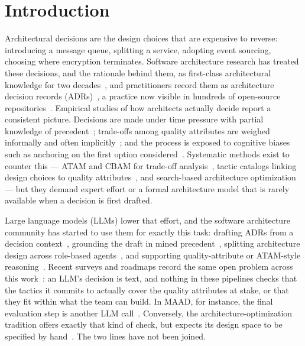 \documentclass[preprint,12pt,authoryear]{elsarticle}
\renewcommand{\_}{\textunderscore\allowbreak{}}
\begin{document}
\linenumbers

\section{Introduction}

Architectural decisions are the design choices that are expensive to reverse: introducing a message queue, splitting a service, adopting event sourcing, choosing where encryption terminates. Software architecture research has treated these decisions, and the rationale behind them, as first-class architectural knowledge for two decades~\citep{jansen2005,kruchten2004,tang2006}, and practitioners record them as architecture decision records (ADRs)~\citep{tyree2005}, a practice now visible in hundreds of open-source repositories~\citep{buchgeher2023adr}. Empirical studies of how architects actually decide report a consistent picture. Decisions are made under time pressure with partial knowledge of precedent~\citep{vanvliet2016,weinreich2015}; trade-offs among quality attributes are weighed informally and often implicitly~\citep{zalewski2017,falessi2011}; and the process is exposed to cognitive biases such as anchoring on the first option considered~\citep{borowa2021,razavian2016}. Systematic methods exist to counter this --- ATAM and CBAM for trade-off analysis~\citep{kazman1998atam,kazman2001cbam}, tactic catalogs linking design choices to quality attributes~\citep{bachmann2003,bass2021saip}, and search-based architecture optimization~\citep{aleti2013,koziolek2011peropteryx} --- but they demand expert effort or a formal architecture model that is rarely available when a decision is first drafted.

Large language models (LLMs) lower that effort, and the software architecture community has started to use them for exactly this task: drafting ADRs from a decision context~\citep{dhar2024llm}, grounding the draft in mined precedent~\citep{contextmatters2026}, splitting architecture design across role-based agents~\citep{zhang2025maad}, and supporting quality-attribute or ATAM-style reasoning~\citep{diazpace2025,capilla2025atam}. Recent surveys and roadmaps record the same open problem across this work~\citep{hou2024,esposito2026,schmid2025}: an LLM's decision is text, and nothing in these pipelines checks that the tactics it commits to actually cover the quality attributes at stake, or that they fit within what the team can build. In MAAD, for instance, the final evaluation step is another LLM call~\citep{zhang2025maad}. Conversely, the architecture-optimization tradition offers exactly that kind of check, but expects its design space to be specified by hand~\citep{aleti2013,martens2010}. The two lines have not been joined.
\end{document}
